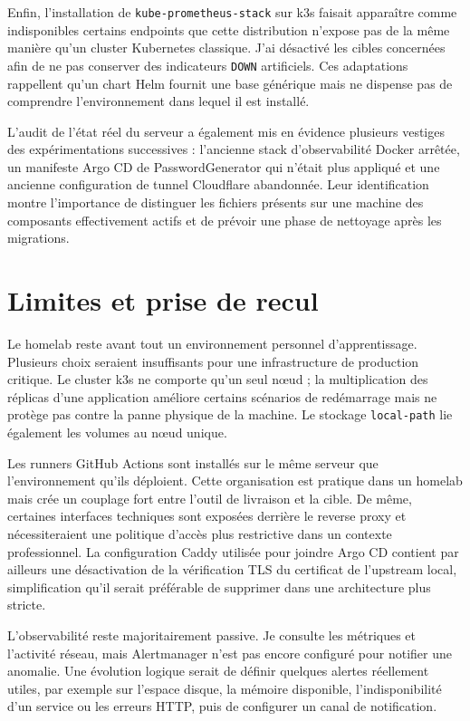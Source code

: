 Enfin, l'installation de \texttt{kube-prometheus-stack} sur k3s faisait apparaître comme indisponibles certains endpoints que cette distribution n'expose pas de la même manière qu'un cluster Kubernetes classique. J'ai désactivé les cibles concernées afin de ne pas conserver des indicateurs \texttt{DOWN} artificiels. Ces adaptations rappellent qu'un chart Helm fournit une base générique mais ne dispense pas de comprendre l'environnement dans lequel il est installé.

L'audit de l'état réel du serveur a également mis en évidence plusieurs vestiges des expérimentations successives : l'ancienne stack d'observabilité Docker arrêtée, un manifeste Argo CD de PasswordGenerator qui n'était plus appliqué et une ancienne configuration de tunnel Cloudflare abandonnée. Leur identification montre l'importance de distinguer les fichiers présents sur une machine des composants effectivement actifs et de prévoir une phase de nettoyage après les migrations.

\section{Limites et prise de recul}

Le homelab reste avant tout un environnement personnel d'apprentissage. Plusieurs choix seraient insuffisants pour une infrastructure de production critique. Le cluster k3s ne comporte qu'un seul nœud ; la multiplication des réplicas d'une application améliore certains scénarios de redémarrage mais ne protège pas contre la panne physique de la machine. Le stockage \texttt{local-path} lie également les volumes au nœud unique.

Les runners GitHub Actions sont installés sur le même serveur que l'environnement qu'ils déploient. Cette organisation est pratique dans un homelab mais crée un couplage fort entre l'outil de livraison et la cible. De même, certaines interfaces techniques sont exposées derrière le reverse proxy et nécessiteraient une politique d'accès plus restrictive dans un contexte professionnel. La configuration Caddy utilisée pour joindre Argo CD contient par ailleurs une désactivation de la vérification TLS du certificat de l'upstream local, simplification qu'il serait préférable de supprimer dans une architecture plus stricte.

L'observabilité reste majoritairement passive. Je consulte les métriques et l'activité réseau, mais Alertmanager n'est pas encore configuré pour notifier une anomalie. Une évolution logique serait de définir quelques alertes réellement utiles, par exemple sur l'espace disque, la mémoire disponible, l'indisponibilité d'un service ou les erreurs HTTP, puis de configurer un canal de notification.

